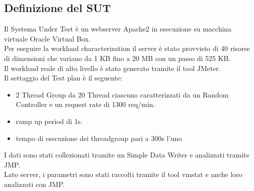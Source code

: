 \subsection{Definizione del SUT}
Il Systema Under Test è un webserver Apache2 in esecuzione su macchina virtuale Oracle Virtual Box.\\
Per eseguire la workload characterization il server è stato provvisto di 40 risorse di dimensioni che variano da 1 KB fino a 20 MB con un passo di 525 KB.\\
Il workload reale di alto livello è stato generato tramite il tool JMeter.\\
Il settaggio del Test plan è il seguente:
\begin{itemize}
    \item 2 Thread Group da 20 Thread ciascuno caratterizzati da un Random Controller e un request rate di 1300 req/min.
    \item ramp up period di 1s.
    \item tempo di esecuzione dei threadgroup pari a 300s l'uno
\end{itemize}
I dati sono stati collezionati tramite un Simple Data Writer e analizzati tramite JMP.\\
Lato server, i parametri sono stati raccolti tramite il tool vmstat e anche loro analizzati con JMP.
